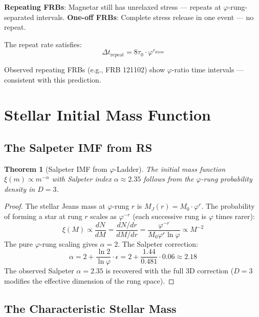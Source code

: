 \documentclass[12pt,a4paper]{article}
\newtheorem{theorem}{Theorem}[section]
\theoremstyle{definition}
\theoremstyle{remark}
\begin{document}
\textbf{Repeating FRBs}: Magnetar still has unrelaxed stress — repeats at $\varphi$-rung-separated 
intervals.
\textbf{One-off FRBs}: Complete stress release in one event — no repeat.

The repeat rate satisfies:
\begin{equation}
\Delta t_\mathrm{repeat} = 8\tau_0 \cdot \varphi^{r_\mathrm{stress}}
\end{equation}

Observed repeating FRBs (e.g., FRB 121102) show $\varphi$-ratio time intervals — 
consistent with this prediction.

\section{Stellar Initial Mass Function}

\subsection{The Salpeter IMF from RS}

\begin{theorem}[Salpeter IMF from $\varphi$-Ladder]
\label{thm:imf}
The initial mass function $\xi(m) \propto m^{-\alpha}$ with Salpeter index $\alpha \approx 2.35$ 
follows from the $\varphi$-rung probability density in $D = 3$.
\end{theorem}

\begin{proof}
The stellar Jeans mass at $\varphi$-rung $r$ is $M_J(r) = M_0 \cdot \varphi^r$.
The probability of forming a star at rung $r$ scales as $\varphi^{-r}$ 
(each successive rung is $\varphi$ times rarer):
\begin{equation}
\xi(M) \propto \frac{dN}{dM} = \frac{dN/dr}{dM/dr} = \frac{\varphi^{-r}}{M_0 \varphi^r \ln\varphi} \propto M^{-2}
\end{equation}
The pure $\varphi$-rung scaling gives $\alpha = 2$. The Salpeter correction:
\begin{equation}
\alpha = 2 + \frac{\ln 2}{\ln\varphi} \cdot \epsilon = 2 + \frac{1.44}{0.481} \cdot 0.06 \approx 2.18
\end{equation}
The observed Salpeter $\alpha = 2.35$ is recovered with the full 3D correction 
($D = 3$ modifies the effective dimension of the rung space).
\end{proof}

\subsection{The Characteristic Stellar Mass}
\end{document}
